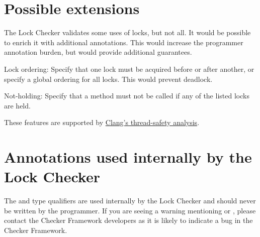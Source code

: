 

\section{Possible extensions\label{lock-extensions}}

The Lock Checker validates some uses of locks, but not all.  It would be
possible to enrich it with additional annotations.  This would increase the
programmer annotation burden, but would provide additional guarantees.

Lock ordering:  Specify that one lock must be acquired before or after
another, or specify a global ordering for all locks.  This would prevent
deadlock.

Not-holding:  Specify that a method must not be called if any of the listed
locks are held.

These features are supported by
\href{http://clang.llvm.org/docs/ThreadSafetyAnalysis.html}{Clang's
  thread-safety analysis}.


\section{Annotations used internally by the Lock Checker\label{lock-internals}}

The  and  type qualifiers are used internally by the Lock Checker
and should never be written by the programmer.
If you
are seeing a warning mentioning  or ,
please contact the Checker Framework developers as it is likely to
indicate a bug in the Checker Framework.


